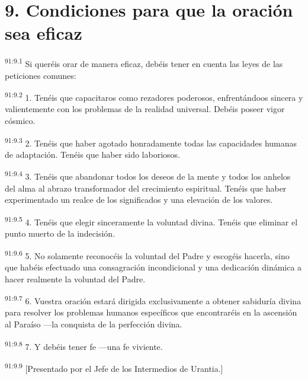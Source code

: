 \section*{9. Condiciones para que la oración sea eficaz}
\par
\textsuperscript{91:9.1} Si queréis orar de manera eficaz, debéis tener en cuenta las leyes de las peticiones comunes:

\par
\textsuperscript{91:9.2} 1. Tenéis que capacitaros como rezadores poderosos, enfrentándoos sincera y valientemente con los problemas de la realidad universal. Debéis poseer vigor cósmico.

\par
\textsuperscript{91:9.3} 2. Tenéis que haber agotado honradamente todas las capacidades humanas de adaptación. Tenéis que haber sido laboriosos.

\par
\textsuperscript{91:9.4} 3. Tenéis que abandonar todos los deseos de la mente y todos los anhelos del alma al abrazo transformador del crecimiento espiritual. Tenéis que haber experimentado un realce de los significados y una elevación de los valores.

\par
\textsuperscript{91:9.5} 4. Tenéis que elegir sinceramente la voluntad divina. Tenéis que eliminar el punto muerto de la indecisión.

\par
\textsuperscript{91:9.6} 5. No solamente reconocéis la voluntad del Padre y escogéis hacerla, sino que habéis efectuado una consagración incondicional y una dedicación dinámica a hacer realmente la voluntad del Padre.

\par
\textsuperscript{91:9.7} 6. Vuestra oración estará dirigida exclusivamente a obtener sabiduría divina para resolver los problemas humanos específicos que encontraréis en la ascensión al Paraíso ---la conquista de la perfección divina.

\par
\textsuperscript{91:9.8} 7. Y debéis tener fe ---una fe viviente.

\par
\textsuperscript{91:9.9} [Presentado por el Jefe de los Intermedios de Urantia.]